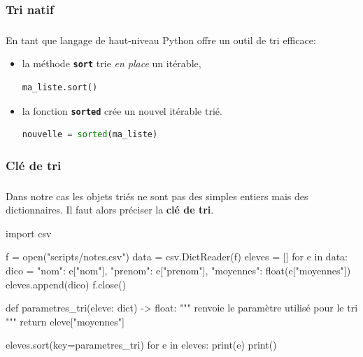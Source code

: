 \documentclass[svgnames,11pt]{beamer}
\begin{document}
\subsubsection{Tri natif}
\begin{frame}[fragile]
    \frametitle{}

    En tant que langage de haut-niveau Python offre un outil de tri efficace:
    \begin{itemize}
        \item la méthode \textbf{\texttt{sort}} trie \emph{en place} un itérable,
              \begin{center}
                  \begin{lstlisting}[language=Python]
ma_liste.sort()
    \end{lstlisting}
              \end{center}
        \item la fonction \textbf{\texttt{sorted}} crée un nouvel itérable trié.
              \begin{center}
                  \begin{lstlisting}[language=Python]
nouvelle = sorted(ma_liste)   
    \end{lstlisting}
              \end{center}
    \end{itemize}

\end{frame}

\subsubsection{Clé de tri}
\begin{frame}[fragile]
    \frametitle{}

    Dans notre cas les objets triés ne sont pas des simples entiers mais des dictionnaires. Il faut alors préciser la \textbf{clé de tri}.
    
\begin{pycode}
import csv

f = open("scripts/notes.csv")
data = csv.DictReader(f)
eleves = []
for e in data:
    dico = {"nom": e["nom"], "prenom": e["prenom"],
            "moyennes": float(e["moyennes"])}
    eleves.append(dico)
f.close()


def parametres_tri(eleve: dict) -> float:
    """
    renvoie le paramètre utilisé pour le tri
    """
    return eleve["moyennes"]

eleves.sort(key=parametres_tri)
for e in eleves:
    print(e)
    print()
    \end{pycode}
\end{frame}
\end{document}
